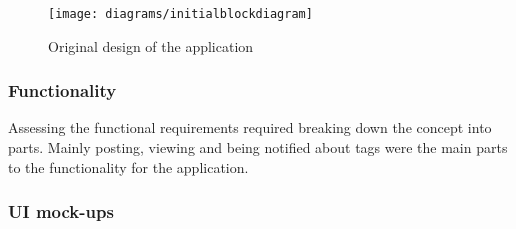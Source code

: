 \begin{figure}[htb!]
    \centering
    \texttt{[image: diagrams/initialblockdiagram]}
    \caption{Original design of the application}
    \label{fig:apex_block_diagram_image}
\end{figure} 

\subsubsection*{Functionality}

Assessing the functional requirements required breaking down the concept into parts. Mainly posting, viewing and being notified about tags were the main parts to the functionality for the application.\\


\subsubsection*{UI mock-ups}

